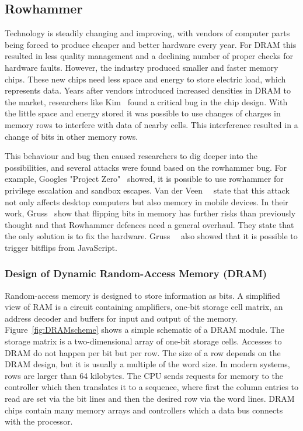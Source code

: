 \subsection{Rowhammer}

Technology is steadily changing and improving, with vendors of computer parts
being forced to produce cheaper and better hardware every year. For DRAM this
resulted in less quality management and a declining number of proper checks for
hardware faults. However, the industry produced smaller and faster memory chips.
These new chips need less space and energy to store electric load, which
represents data. Years after vendors introduced increased densities in DRAM to
the market, researchers like Kim~\etal\cite{rowhammergeneral} found a critical
bug in the chip design. With the little space and energy stored it was possible
to use changes of charges in memory rows to interfere with data of nearby cells.
This interference resulted in a change of bits in other memory rows.

This behaviour and bug then caused researchers to dig deeper into the
possibilities, and several attacks were found based on the rowhammer bug. For
example, Google\textquotesingle s "Project Zero"~\cite{projectzerorow} showed,
it is possible to use rowhammer for privilege escalation and sandbox escapes.
Van der Veen~\etal~\cite{drammer} state that this attack not only affects
desktop computers but also memory in mobile devices. In their work,
Gruss~\etal\cite{flipinthewall} show that flipping bits in memory has further
risks than previously thought and that Rowhammer defences need a general
overhaul. They state that the only solution is to fix the hardware.
Gruss~\etal~\cite{rowhammerjs} also showed that it is possible to trigger
bitflips from JavaScript.

\subsubsection{Design of Dynamic Random-Access Memory (DRAM)}

Random-access memory is designed to store information as bits. A simplified view
of RAM is a circuit containing amplifiers, one-bit storage cell matrix, an
address decoder and buffers for input and output of the memory.
Figure~\ref{fig:DRAMscheme} shows a simple schematic of a DRAM module. The
storage matrix is a two-dimensional array of one-bit storage cells. Accesses to
DRAM do not happen per bit but per row. The size of a row depends on the DRAM
design, but it is usually a multiple of the word size. In modern systems, rows
are larger than 64 kilobytes. The CPU sends requests for memory to the
controller which then translates it to a sequence, where first the column
entries to read are set via the bit lines and then the desired row via the word
lines. DRAM chips contain many memory arrays and controllers which a data bus
connects with the processor.

